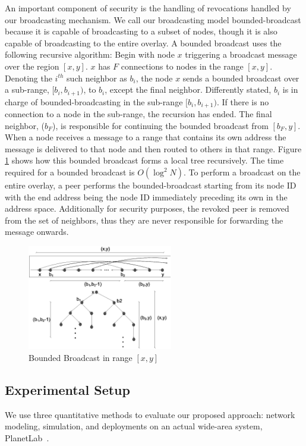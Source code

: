 \documentclass[conference]{IEEEtran}
\begin{document}
An important component of security is the handling of revocations handled by our
broadcasting mechanism.  We call our broadcasting model bounded-broadcast
because it is capable of broadcasting to a subset of nodes, though it is also capable
of broadcasting to the entire overlay.  A bounded broadcast uses the following
recursive algorithm:  Begin with node $x$ triggering a broadcast message over
the region $[x, y]$.  $x$ has $F$ connections to nodes in the range $[x, y]$.
Denoting the $i^{th}$ such neighbor as $b_i$, the node $x$ sends a bounded
broadcast over a sub-range, $[b_i, b_{i+1})$, to $b_i$, except the final
neighbor.  Differently stated, $b_i$ is in charge of bounded-broadcasting 
in the sub-range $[b_i, b_{i+1})$. If there is no connection to a node in the
sub-range, the recursion has ended.  The final neighbor, ($b_F$), is responsible
for continuing the bounded broadcast from $[b_F, y]$.  When a node receives a
message to a range that contains its own address the message is delivered to
that node and then routed to others in that range.  Figure \ref{fig:tree} shows
how this bounded broadcast forms a local tree recursively.   The time required
for a bounded broadcast is $O(\log^2 N)$.  To perform a broadcast on the entire
overlay, a peer performs the bounded-broadcast starting from its node ID with the
end address being the node ID immediately preceding its own in the address space.
Additionally for security purposes, the revoked peer is removed from the set of
neighbors, thus they are never responsible for forwarding the message onwards.

\begin{figure}[!h]
\centering
\includegraphics[width=2.5in]{tree}
\caption{Bounded Broadcast in range $[x, y]$}
\label{fig:tree}
\end{figure}

\subsection{Experimental Setup}
We use three quantitative methods to evaluate our proposed approach: network
modeling, simulation, and deployments on an actual wide-area system,
PlanetLab~\cite{planetlab}.
\end{document}
